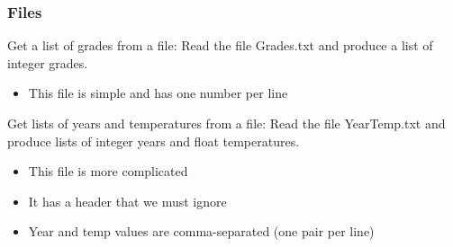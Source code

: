 \documentclass{beamer}
\begin{document}
\begin{frame}	
	\frametitle{Files}
	
	\begin{exampleblock}{Get a list of grades from a file:}
		Read the file Grades.txt and produce a list of integer grades.
		\begin{itemize}
			\item This file is simple and has one number per line
		\end{itemize}
	\end{exampleblock}
	
	\begin{exampleblock}{Get lists of years and temperatures from a file:}
		Read the file YearTemp.txt and produce lists of integer years and float temperatures.
		\begin{itemize}
			\item This file is more complicated
			\item It has a header that we must ignore
			\item Year and temp values are comma-separated (one pair per line)
		\end{itemize}
	\end{exampleblock}
	
\end{frame}
\end{document}
